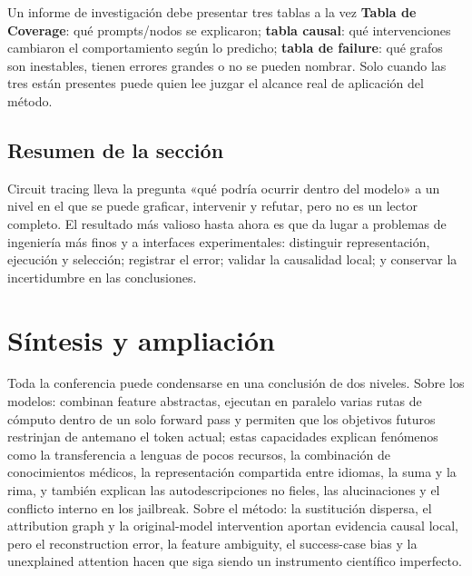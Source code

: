 \documentclass[a4paper]{article}
\begin{document}

\begin{knowledgebox}{Un informe de investigación debe presentar tres tablas a la vez}
\textbf{Tabla de Coverage}: qué prompts/nodos se explicaron; \textbf{tabla causal}: qué intervenciones cambiaron el comportamiento según lo predicho; \textbf{tabla de failure}: qué grafos son inestables, tienen errores grandes o no se pueden nombrar. Solo cuando las tres están presentes puede quien lee juzgar el alcance real de aplicación del método.
\end{knowledgebox}

\subsection{Resumen de la sección}

Circuit tracing lleva la pregunta «qué podría ocurrir dentro del modelo» a un nivel en el que se puede graficar, intervenir y refutar, pero no es un lector completo. El resultado más valioso hasta ahora es que da lugar a problemas de ingeniería más finos y a interfaces experimentales: distinguir representación, ejecución y selección; registrar el error; validar la causalidad local; y conservar la incertidumbre en las conclusiones.
\section{Síntesis y ampliación}

Toda la conferencia puede condensarse en una conclusión de dos niveles. Sobre los modelos: combinan feature abstractas, ejecutan en paralelo varias rutas de cómputo dentro de un solo forward pass y permiten que los objetivos futuros restrinjan de antemano el token actual; estas capacidades explican fenómenos como la transferencia a lenguas de pocos recursos, la combinación de conocimientos médicos, la representación compartida entre idiomas, la suma y la rima, y también explican las autodescripciones no fieles, las alucinaciones y el conflicto interno en los jailbreak. Sobre el método: la sustitución dispersa, el attribution graph y la original-model intervention aportan evidencia causal local, pero el reconstruction error, la feature ambiguity, el success-case bias y la unexplained attention hacen que siga siendo un instrumento científico imperfecto.
\end{document}
